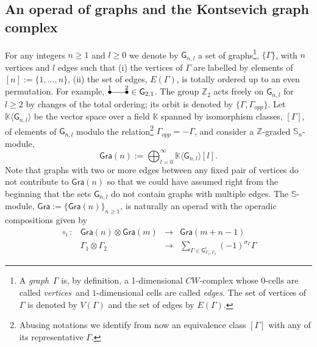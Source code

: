 \documentclass{amsart}
\theoremstyle{plain}
\theoremstyle{definition}
\begin{document}
\subsection{An operad of graphs and the Kontsevich graph complex}
For any integers $n\geq 1$ and $l\geq 0$ we denote by ${{\mathsf G}}_{n,l}$ a set of graphs\footnote{ A {\em graph}\, ${\Gamma}$ is, by definition,  a 1-dimensional $CW$-complex whose $0$-cells are called {\em vertices}\, and $1$-dimensional cells are called {\em edges}. The set of vertices of ${\Gamma}$ is denoted by $V({\Gamma})$ and the set of edges by $E({\Gamma})$.}, $\{{\Gamma}\}$, with $n$ vertices and $l$ edges
such that (i) the vertices of ${\Gamma}$ are labelled by elements of $[n]:=\{1,\ldots, n\}$,
(ii) the set of edges, $E({\Gamma})$, is totally ordered up to an even permutation.
For example, $\xy
(0,2)*{_{1}},
(7,2)*{_{2}},
 (0,0)*{\bullet}="a",
(7,0)*{\bullet}="b",
\ar @{-} "a";"b" <0pt>
\endxy\in {{\mathsf G}}_{2,1}$.
The group ${{\mathbb Z}}_2$ acts freely  on ${{\mathsf G}}_{n,l}$ for $l\geq 2$ by changes of the total ordering;  its orbit
is denoted by $\{{\Gamma}, {\Gamma}_{opp}\}$. Let ${{\mathbb K}}\langle {{\mathsf G}}_{n,l}\rangle$  be the vector space over  a field ${{\mathbb K}}$ spanned by isomorphism classes, $[{\Gamma}]$, of elements of ${{\mathsf G}}_{n,l}$ modulo the relation\footnote{Abusing notations we identify from now an equivalence class $[{\Gamma}]$ with any
of its representative ${\Gamma}$.}  ${\Gamma}_{opp}=-{\Gamma}$, and consider
a ${{\mathbb Z}}$-graded ${{\mathbb S}}_n$-module,
$$
{{\mathsf G}} {{\mathsf r}}{{\mathsf a}} (n):=\bigoplus_{l=0}^\infty {{\mathbb K}}\langle {{\mathsf G}}_{n,l}\rangle[l].
$$
Note that graphs with two or more edges between any fixed pair of vertices do not contribute to
${{\mathsf G}} {{\mathsf r}}{{\mathsf a}} (n)$ so that we could have assumed right from the beginning that the sets ${{\mathsf G}}_{n,l}$ do not contain graphs with multiple edges. The ${{\mathbb S}}$-module, ${{\mathsf G}} {{\mathsf r}}{{\mathsf a}} :=\{{{\mathsf G}} {{\mathsf r}}{{\mathsf a}} (n)\}_{n\geq 1}$, is naturally an operad with the  operadic compositions given by
$$
\begin{array}{rccc}
\circ_i: & {{\mathsf G}} {{\mathsf r}}{{\mathsf a}} (n){\otimes} {{\mathsf G}} {{\mathsf r}}{{\mathsf a}} (m) & {\longrightarrow} &  {{\mathsf G}} {{\mathsf r}}{{\mathsf a}} (m+n-1)\\
&  {\Gamma}_1 {\otimes} {\Gamma}_2   &{\longrightarrow} & \sum_{{\Gamma}\in {{\mathsf G}}_{{\Gamma}_1, {\Gamma}_2}^i} (-1)^{\sigma_{\Gamma}} {\Gamma}
\end{array}
$$
\end{document}
